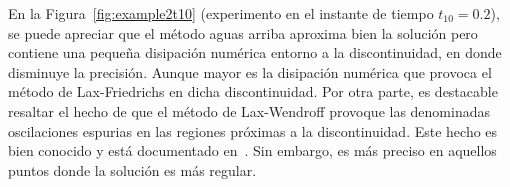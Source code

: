 En la Figura~\ref{fig:example2t10} (experimento en el instante de tiempo $t_10=0.2$),
se puede apreciar que el método aguas arriba aproxima bien la
solución pero contiene una pequeña disipación numérica entorno a la
discontinuidad, en donde disminuye la precisión.
Aunque mayor es la disipación numérica que provoca el método de
Lax-Friedrichs en dicha discontinuidad.
Por otra parte, es destacable resaltar el hecho de que el método de
Lax-Wendroff provoque las denominadas oscilaciones espurias en las
regiones próximas a la discontinuidad.
Este hecho es bien conocido y está documentado en~\cite{Leveque2002}.
Sin embargo, es más preciso en aquellos puntos donde la solución es
más regular.